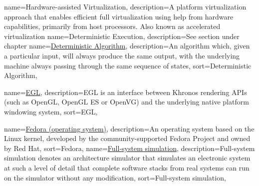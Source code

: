 {
  name=Hardware-assisted Virtualization,
  description={A platform virtualization approach that enables efficient full virtualization using help from hardware capabilities, primarily from host processors. Also known as accelerated virtualization}
}
\newcommand{\dvttermdirectvirtualization}{\dvtcmdcaponcegloss{dvtglossdirectvirtualization}{Hardware-assisted Virtualization}}
\newcommand{\dvttermdirectx}{DirectX}
{
  name=Deterministic Execution,
  description={See section  under chapter }
}
\newcommand{\dvttermdeterministicexecution}{\dvtcmdcaponcegloss{dvtglossdeterministicexecution}{Deterministic Execution}}
{
  name=\href{http://en.wikipedia.org/wiki/Deterministic_algorithm}{Deterministic Algorithm},
  description={An algorithm which, given a particular input, will always produce the same output, with the underlying machine always passing through the same sequence of states},
  sort={Deterministic Algorithm},
}
\newcommand{\dvttermdeterministicalgorithm}{\dvtcmdcaponcegloss{dvtglossdeterministicalgorithm}{Deterministic Algorithm}}

\newcommand{\dvttermericsson}{Ericsson}
{
  name={\href{http://en.wikipedia.org/wiki/EGL_(API)}{EGL}},
  description={EGL is an interface between Khronos rendering APIs (such as OpenGL, OpenGL ES or OpenVG) and the underlying native platform windowing system},
  sort={EGL},
}
\newcommand{\dvttermegl}{\glslink{dvtglossegl}{EGL}}

{
    name={\href{http://en.wikipedia.org/wiki/Fedora_(operating_system)}{Fedora (operating system)}},
    description={An operating system based on the Linux kernel, developed by the community-supported Fedora Project and owned by Red Hat},
    sort={Fedora},
}
\newcommand{\dvttermfedora}{\glslink{dvtglossfedora}{Fedora 19}}
{
    name={\href{http://en.wikipedia.org/wiki/Full_system_simulator}{Full-system simulation}},
    description={Full-system simulation denotes an architecture simulator that simulates an electronic system at such a level of detail that complete software stacks from real systems can run on the simulator without any modification},
    sort={Full-system simulation},
}
\newcommand{\dvttermfullsystemsimulation}{\dvtcmdcaponcegloss{dvtglossfullsystemsimulation}{Full-system Simulation}}
\newcommand{\dvttermfreescalesemiconductor}{Freescale Semiconductor, Inc.}
\newcommand{\dvttermfps}{\dvtcmdabbrev{dvtglossfps}}

